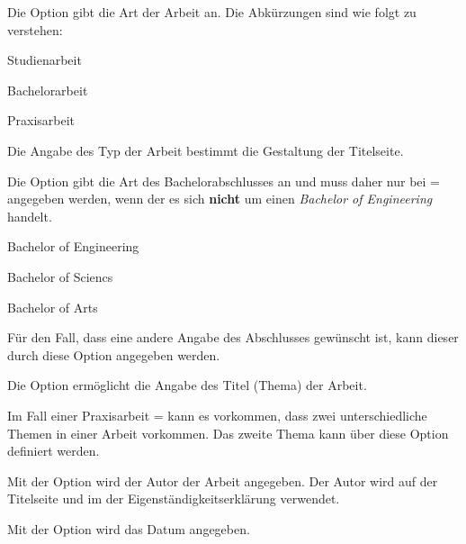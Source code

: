 \documentclass[babel=ngerman,highlight=false]{skdoc}
\begin{document}
            Die Option gibt die Art der Arbeit an. Die Abkürzungen sind wie folgt zu verstehen:
            \begin{description}[noitemsep,style=multiline,leftmargin=1cm]
                \item[SA] Studienarbeit
                \item[BA] Bachelorarbeit
                \item[PA] Praxisarbeit
            \end{description}
            Die Angabe des Typ der Arbeit bestimmt die Gestaltung der Titelseite.\medskip

            Die Option gibt die Art des Bachelorabschlusses an und muss daher nur bei  =  angegeben werden, wenn der es sich \textbf{nicht} um einen \textit{Bachelor of Engineering} handelt.
            \begin{description}[noitemsep,style=multiline,leftmargin=1cm]
                \item[BoE] Bachelor of Engineering
                \item[BoA] Bachelor of Sciencs
                \item[BoS] Bachelor of Arts
            \end{description}\medskip

            Für den Fall, dass eine andere Angabe des Abschlusses gewünscht ist, kann dieser durch diese Option angegeben werden.\medskip

            Die Option ermöglicht die Angabe des Titel (Thema) der Arbeit.\medskip

            Im Fall einer Praxisarbeit  =  kann es vorkommen, dass zwei unterschiedliche Themen in einer Arbeit vorkommen. Das zweite Thema kann über diese Option definiert werden.\medskip

            Mit der Option wird der Autor der Arbeit angegeben. Der Autor wird auf der Titelseite und im der Eigenständigkeitserklärung verwendet.\medskip

            Mit der Option wird das Datum angegeben.\medskip
\end{document}
